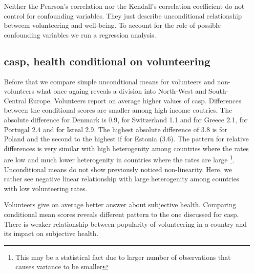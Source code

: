 \documentclass[10pt, letterpaper]{article}
\begin{document}
\begin{spacing}{1.4}
Neither the Pearson's correlation nor the Kendall's correlation coefficient  do not control for confounding variables. They just describe unconditional relationship betweem volunteering and well-being. To account for the role of possible confounding variables we run a regression analysis.   

\subsection{casp, health conditional on volunteering }

Before that we compare simple uncondtional means for volunteers and non-volunteers what once againg reveals a division into North-West and South-Central Europe. Volunteers report on average higher values of casp. Differences between the conditional scores are smaller among  high income coutries. The absolute difference for Denmark  is 0.9, for Switzerland 1.1 and for Greece 2.1, for Portugal 2.4 and for Isreal 2.9. The highest absolute difference of 3.8 is for Poland and the second to the highest if for Estonia (3.6). The pattern for relative differences is very similar with high heterogenity among countries where the rates are low and much lower heterogenity in countries where the rates are large \footnote{This may be a statistical fact due to larger number of observations that causes variance to be smaller}. 
Unconditional means do not show previously noticed non-linearity. Here, we rather see negative linear relationship with large heterogenity among countries with low volunteering rates.

Volunteers give on average better answer about subjective health. Comparing conditional mean scores reveals different pattern to the one discussed for casp. There is weaker relationship between popularity of volunteering in a country and its impact on subjective health. 



\end{spacing}
\end{document}
